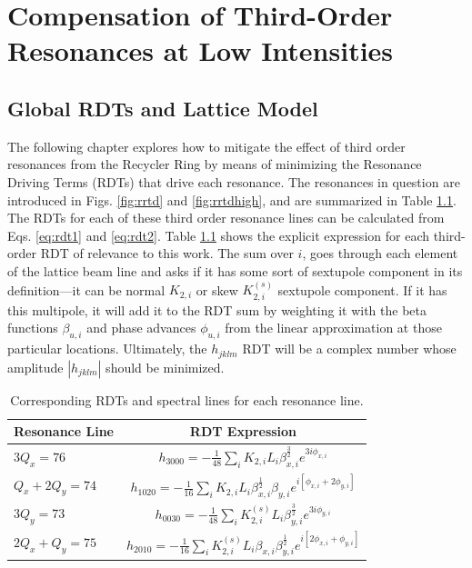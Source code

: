 \chapter{Compensation of Third-Order Resonances at Low Intensities}
\label{sec:ch4}

\section{\label{sec:rdtslattice}Global RDTs and Lattice Model}

The following chapter explores how to mitigate the effect of third order resonances from the Recycler Ring by means of minimizing the Resonance Driving Terms (RDTs) that drive each resonance. The resonances in question are introduced in Figs. \ref{fig:rrtd} and \ref{fig:rrtdhigh}, and are summarized in Table \ref{tab:rdts}. The RDTs for each of these third order resonance lines can be calculated from Eqs. \ref{eq:rdt1} and \ref{eq:rdt2}. Table \ref{tab:rdts} shows the explicit expression for each third-order RDT of relevance to this work. The sum over $i$, goes through each element of the lattice beam line and asks if it has some sort of sextupole component in its definition---it can be normal $K_{2,i}$ or skew $K_{2,i}^{(s)}$ sextupole component. If it has this multipole, it will add it to the RDT sum by weighting it with the beta functions $\beta_{u,i}$ and phase advances $\phi_{u,i}$ from the linear approximation at those particular locations. Ultimately, the $h_{jklm}$ RDT will be a complex number whose amplitude $|h_{jklm}|$ should be minimized.

\begin{table}[H]
    \centering
    \caption{Corresponding RDTs and spectral lines for each resonance line.}
    \begin{tabular}{lc}
        \toprule
        \textbf{Resonance Line} & \textbf{RDT Expression} \\
        \midrule
            $3Q_x=76$     & $\displaystyle{h_{3000} = -\frac{1}{48}\sum_i K_{2,i} L_i \beta_{x,i}^{\frac{3}{2}} e^{3i\phi_{x,i}}}$    \\ %
           $Q_x+2Q_y=74$   &  $\displaystyle{h_{1020} = -\frac{1}{16} \sum_i K_{2,i} L_i \beta_{x,i}^{\frac{1}{2}} \beta_{y,i} e^{i \left[ \phi_{x,i} + 2\phi_{y,i}\right]} }$       \\ %
            $3Q_y=73$     &  $ \displaystyle{h_{0030} = -\frac{1}{48}\sum_i K_{2,i}^{(s)} L_i \beta_{y,i}^{\frac{3}{2}} e^{3i\phi_{y,i}}}$ \\ %
            $2Q_x+Q_y=75$   & $ \displaystyle{h_{2010} = -\frac{1}{16}\sum_i K_{2,i}^{(s)} L_i \beta_{x,i} \beta_{y,i}^{\frac{1}{2}} e^{i \left[ 2\phi_{x,i} + \phi_{y,i}\right]}}$       \\
        \bottomrule
    \end{tabular}
    \label{tab:rdts}
\end{table}

